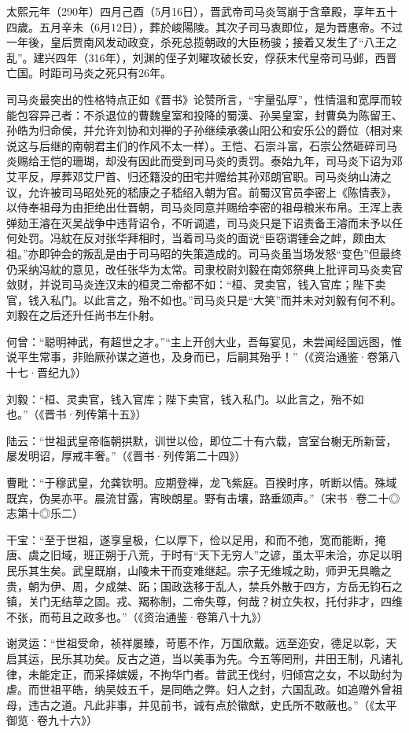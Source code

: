 太熙元年（290年）四月己酉（5月16日），晋武帝司马炎驾崩于含章殿，享年五十四歲。五月辛未（6月12日），葬於峻陽陵。其次子司马衷即位，是为晋惠帝。不过一年後，皇后贾南风发动政变，杀死总揽朝政的大臣杨骏；接着又发生了“八王之乱”。建兴四年（316年），刘渊的侄子刘曜攻破长安，俘获末代皇帝司马邺，西晋亡国。时距司马炎之死只有26年。

司马炎最突出的性格特点正如《晋书》论赞所言，“宇量弘厚”，性情温和宽厚而较能包容异己者：不杀退位的曹魏皇室和投降的蜀漢、孙吴皇室，封曹奂为陈留王、孙皓为归命侯，并允许刘协和刘禅的子孙继续承袭山阳公和安乐公的爵位（相对来说这与后继的南朝君主们的作风不太一样）。王恺、石崇斗富，石崇公然砸碎司马炎赐给王恺的珊瑚，却没有因此而受到司马炎的责罚。泰始九年，司马炎下诏为邓艾平反，厚葬邓艾尸首、归还籍没的田宅并赠给其孙邓朗官职。司马炎纳山涛之议，允许被司马昭处死的嵇康之子嵇绍入朝为官。前蜀汉官员李密上《陈情表》，以侍奉祖母为由拒绝出仕晋朝，司马炎同意并赐给李密的祖母粮米布帛。王浑上表弹劾王濬在灭吴战争中违背诏令，不听调遣，司马炎只是下诏责备王濬而未予以任何处罚。冯紞在反对张华拜相时，当着司马炎的面说“臣窃谓锺会之衅，颇由太祖。”亦即钟会的叛乱是由于司马昭的失策造成的。司马炎虽当场发怒“变色”但最终仍采纳冯紞的意见，改任张华为太常。司隶校尉刘毅在南郊祭典上批评司马炎卖官敛财，并说司马炎连汉末的桓灵二帝都不如：“桓、灵卖官，钱入官库；陛下卖官，钱入私门。以此言之，殆不如也。”司马炎只是“大笑”而并未对刘毅有何不利。刘毅在之后还升任尚书左仆射。

何曾：“聪明神武，有超世之才。”“主上开创大业，吾每宴见，未尝闻经国远图，惟说平生常事，非贻厥孙谋之道也，及身而已，后嗣其殆乎！”（《资治通鉴·卷第八十七·晋纪九》）

刘毅：“桓、灵卖官，钱入官库；陛下卖官，钱入私门。以此言之，殆不如也。”（《晋书·列传第十五》）

陆云：“世祖武皇帝临朝拱默，训世以俭，即位二十有六载，宫室台榭无所新营，屡发明诏，厚戒丰奢。”（《晋书·列传第二十四》）

曹毗：“于穆武皇，允龚钦明。应期登禅，龙飞紫庭。百揆时序，听断以情。殊域既宾，伪吴亦平。晨流甘露，宵映朗星。野有击壤，路垂颂声。”（宋书·卷二十◎志第十◎乐二）

干宝：“至于世祖，遂享皇极，仁以厚下，俭以足用，和而不弛，宽而能断，掩唐、虞之旧域，班正朔于八荒，于时有“天下无穷人”之谚，虽太平未洽，亦足以明民乐其生矣。武皇既崩，山陵未干而变难继起。宗子无维城之助，师尹无具瞻之贵，朝为伊、周，夕成桀、跖；国政迭移于乱人，禁兵外散于四方，方岳无钧石之镇，关门无结草之固。戎、羯称制，二帝失尊，何哉？树立失权，托付非才，四维不张，而苟且之政多也。”（《资治通鉴·卷第八十九》）

谢灵运：“世祖受命，祯祥屡臻，苛慝不作，万国欣戴。远至迩安，德足以彰，天启其运，民乐其功矣。反古之道，当以美事为先。今五等罔刑，井田王制，凡诸礼律，未能定正，而采择嫔媛，不拘华门者。昔武王伐纣，归倾宫之女，不以助纣为虐。而世祖平皓，纳吴妓五千，是同皓之弊。妇人之封，六国乱政。如追赠外曾祖母，违古之道。凡此非事，并见前书，诚有点於徽猷，史氏所不敢蔽也。”（《太平御览·卷九十六》）

